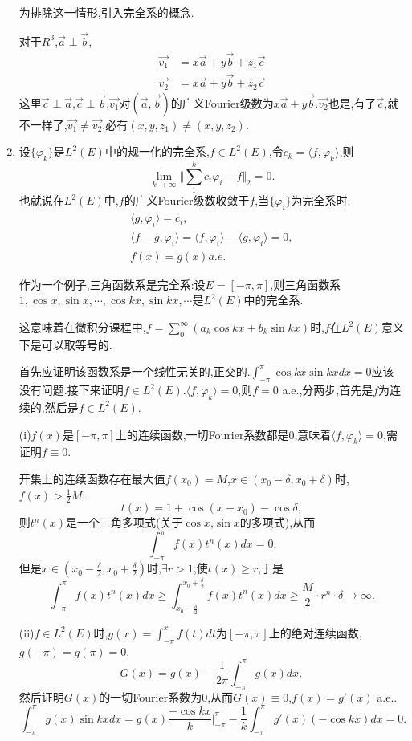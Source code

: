 \documentclass[12pt,a4paper,openany]{book}
\begin{document}
\begin{enumerate}
为排除这一情形,引入完全系的概念.

对于$R^3$,$\vec{a} \perp \vec{b}$,
\[
\begin{aligned}
\vec{v_1} &= x\vec{a} + y\vec{b} + z_1\vec{c}\\
\vec{v_2} &= x\vec{a} + y\vec{b} + z_2\vec{c}
\end{aligned}
\]
这里$\vec{c} \perp \vec{a}$,$\vec{c} \perp \vec{b}$,$\vec{v_1}$对$(\vec{a},\vec{b})$的广义Fourier级数为$x\vec{a}+y\vec{b}$.$\vec{v_2}$也是,有了$\vec{c}$,就不一样了,$\vec{v_1} \neq \vec{v_2}$,必有$(x,y,z_1) \neq (x,y,z_2)$.

\item 设$\{\varphi_k\}$是$L^2(E)$中的规一化的完全系,$f \in L^2(E)$,令$c_k=\langle{f,\varphi_k}\rangle$,则
\[
\lim_{k \rightarrow \infty}{\Vert{\sum_{1}^{k}{c_i\varphi_i} - f}\Vert_2}=0.
\]
也就说在$L^2(E)$中,$f$的广义Fourier级数收敛于$f$,当$\{\varphi_i\}$为完全系时.
\begin{gather*}
\langle{g,\varphi_i}\rangle=c_i,\\
\langle{f-g,\varphi_i}\rangle=\langle{f,\varphi_i}\rangle-\langle{g,\varphi_i}\rangle=0,\\
f(x)=g(x) a.e.
\end{gather*}

作为一个例子,三角函数系是完全系:设$E=[-\pi,\pi]$,则三角函数系$1, \cos{x}, \sin{x},\cdots, \cos{kx}, \sin{kx}, \cdots$是$L^2(E)$中的完全系.

这意味着在微积分课程中,$f=\sum_{0}^{\infty}{(a_k\cos{kx} + b_k\sin{kx})}$时,$f$在$L^2(E)$意义下是可以取等号的.

首先应证明该函数系是一个线性无关的,正交的.$\int_{-\pi}^{\pi}{\cos{kx}\sin{kx}dx}=0$应该没有问题.接下来证明$f \in L^2(E)$.$\langle{f,\varphi_k}\rangle=0$,则$f=0$ a.e.,分两步,首先是$f$为连续的,然后是$f \in L^2(E)$.

(i)$f(x)$是$[-\pi,\pi]$上的连续函数,一切Fourier系数都是0,意味着$\langle{f, \varphi_k}\rangle=0$,需证明$f \equiv 0$.

开集上的连续函数存在最大值$f(x_0)=M$,$x \in (x_0-\delta,x_0+\delta)$时,$f(x)>\frac{1}{2}M$.
\[
t(x)=1 + \cos{(x - x_0)}-\cos{\delta},
\]
则$t^n(x)$是一个三角多项式(关于$\cos{x}$,$\sin{x}$的多项式),从而
\[
\int_{-\pi}^{\pi}{f(x)t^n(x)dx}=0.
\]
但是$x \in (x_0 - \frac{\delta}{2},x_0+\frac{\delta}{2})$时,$\exists r>1$,使$t(x) \ge r$,于是
\[
\int_{-\pi}^{\pi}{f(x)t^n(x)dx} \ge \int_{x_0-\frac{\delta}{2}}^{x_0+\frac{\delta}{2}}{f(x)t^n(x)dx} \ge \frac{M}{2} \cdot r^n \cdot \delta \rightarrow \infty.
\]

(ii)$f \in L^2(E)$时,$g(x)=\int_{-\pi}^{x}{f(t)dt}$为$[-\pi,\pi]$上的绝对连续函数,$g(-\pi)=g(\pi)=0$,
\[
G(x)=g(x)-\frac{1}{2\pi}\int_{-\pi}^{\pi}{g(x)dx},
\]
然后证明$G(x)$的一切Fourier系数为0,从而$G(x) \equiv 0$,$f(x)=g'(x)$ a.e..
\[
\int_{-\pi}^{\pi}{g(x)\sin{kx}dx} = g(x)\frac{-\cos{kx}}{k}|_{-\pi}^{\pi}-\frac{1}{k}\int_{-\pi}^{\pi}{g'(x)(-\cos{kx})dx}=0.
\]


\end{enumerate}
\end{document}
